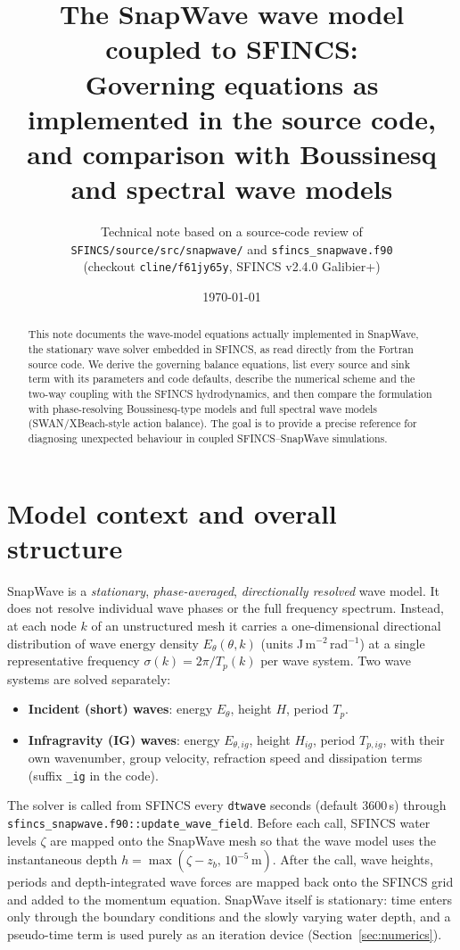 \documentclass[11pt,a4paper]{article}
\title{The SnapWave wave model coupled to SFINCS:\\[2pt]
\large Governing equations as implemented in the source code,\\
and comparison with Boussinesq and spectral wave models}
\author{Technical note based on a source-code review of\\
\texttt{SFINCS/source/src/snapwave/} and \texttt{sfincs\_snapwave.f90}\\
(checkout \texttt{cline/f61jy65y}, SFINCS v2.4.0 Galibier+)}
\date{\today}
\newcommand{\ee}{E_\theta}
\newcommand{\code}[1]{\texttt{#1}}
\begin{document}
\maketitle

\begin{abstract}
\noindent
This note documents the wave-model equations actually implemented in SnapWave,
the stationary wave solver embedded in SFINCS, as read directly from the Fortran
source code. We derive the governing balance equations, list every source and
sink term with its parameters and code defaults, describe the numerical scheme
and the two-way coupling with the SFINCS hydrodynamics, and then compare the
formulation with phase-resolving Boussinesq-type models and full spectral wave
models (SWAN/XBeach-style action balance). The goal is to provide a precise
reference for diagnosing unexpected behaviour in coupled SFINCS--SnapWave
simulations.
\end{abstract}

\tableofcontents
\newpage

\section{Model context and overall structure}

SnapWave is a \emph{stationary}, \emph{phase-averaged}, \emph{directionally
resolved} wave model. It does not resolve individual wave phases or the full
frequency spectrum. Instead, at each node $k$ of an unstructured mesh it
carries a one-dimensional directional distribution of wave energy density
$\ee(\theta,k)$ (units J\,m$^{-2}$\,rad$^{-1}$) at a single representative
frequency $\sigma(k) = 2\pi/T_p(k)$ per wave system. Two wave systems are
solved separately:

\begin{itemize}
  \item \textbf{Incident (short) waves}: energy $\ee$, height $H$, period $T_p$.
  \item \textbf{Infragravity (IG) waves}: energy $E_{\theta,ig}$, height $H_{ig}$,
  period $T_{p,ig}$, with their own wavenumber, group velocity, refraction speed
  and dissipation terms (suffix \code{\_ig} in the code).
\end{itemize}

The solver is called from SFINCS every \code{dtwave} seconds (default 3600\,s)
through \code{sfincs\_snapwave.f90::update\_wave\_field}. Before each call,
SFINCS water levels $\zeta$ are mapped onto the SnapWave mesh so that the wave
model uses the instantaneous depth $h = \max(\zeta - z_b,\,10^{-5}\,\mathrm{m})$.
After the call, wave heights, periods and depth-integrated wave forces are
mapped back onto the SFINCS grid and added to the momentum equation. SnapWave
itself is stationary: time enters only through the boundary conditions and the
slowly varying water depth, and a pseudo-time term is used purely as an
iteration device (Section~\ref{sec:numerics}).
\end{document}
